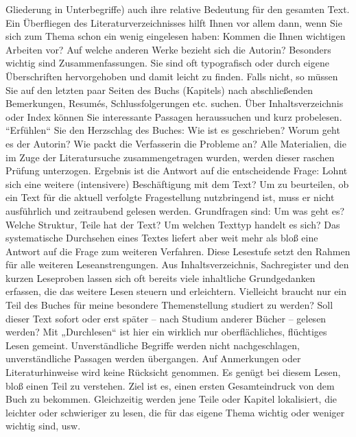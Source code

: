 \documentclass[]{book}
\theoremstyle{definition}
\theoremstyle{definition}
\theoremstyle{definition}
\theoremstyle{remark}
\begin{document}
Gliederung in Unterbegriffe) auch ihre relative Bedeutung für den
gesamten Text. Ein Überfliegen des Literaturverzeichnisses hilft Ihnen
vor allem dann, wenn Sie sich zum Thema schon ein wenig eingelesen
haben: Kommen die Ihnen wichtigen Arbeiten vor? Auf welche anderen Werke
bezieht sich die Autorin? Besonders wichtig sind Zusammenfassungen. Sie
sind oft typografisch oder durch eigene Überschriften hervorgehoben und
damit leicht zu finden. Falls nicht, so müssen Sie auf den letzten paar
Seiten des Buchs (Kapitels) nach abschließenden Bemerkungen, Resumés,
Schlussfolgerungen etc. suchen. Über Inhaltsverzeichnis oder Index
können Sie interessante Passagen heraussuchen und kurz probelesen.
``Erfühlen`` Sie den Herzschlag des Buches: Wie ist es geschrieben?
Worum geht es der Autorin? Wie packt die Verfasserin die Probleme an?
Alle Materialien, die im Zuge der Literatursuche zusammengetragen
wurden, werden dieser raschen Prüfung unterzogen. Ergebnis ist die
Antwort auf die entscheidende Frage: Lohnt sich eine weitere
(intensivere) Beschäftigung mit dem Text? Um zu beurteilen, ob ein Text
für die aktuell verfolgte Fragestellung nutzbringend ist, muss er nicht
ausführlich und zeitraubend gelesen werden. Grundfragen sind: Um was
geht es? Welche Struktur, Teile hat der Text? Um welchen Texttyp handelt
es sich? Das systematische Durchsehen eines Textes liefert aber weit
mehr als bloß eine Antwort auf die Frage zum weiteren Verfahren. Diese
Lesestufe setzt den Rahmen für alle weiteren Leseanstrengungen. Aus
Inhaltsverzeichnis, Sachregister und den kurzen Leseproben lassen sich
oft bereits viele inhaltliche Grundgedanken erfassen, die das weitere
Lesen steuern und erleichtern. Vielleicht braucht nur ein Teil des
Buches für meine besondere Themenstellung studiert zu werden? Soll
dieser Text sofort oder erst später -- nach Studium anderer Bücher --
gelesen werden? Mit „Durchlesen`` ist hier ein wirklich nur
oberflächliches, flüchtiges Lesen gemeint. Unverständliche Begriffe
werden nicht nachgeschlagen, unverständliche Passagen werden übergangen.
Auf Anmerkungen oder Literaturhinweise wird keine Rücksicht genommen. Es
genügt bei diesem Lesen, bloß einen Teil zu verstehen. Ziel ist es,
einen ersten Gesamteindruck von dem Buch zu bekommen. Gleichzeitig
werden jene Teile oder Kapitel lokalisiert, die leichter oder
schwieriger zu lesen, die für das eigene Thema wichtig oder weniger
wichtig sind, usw.
\end{document}
